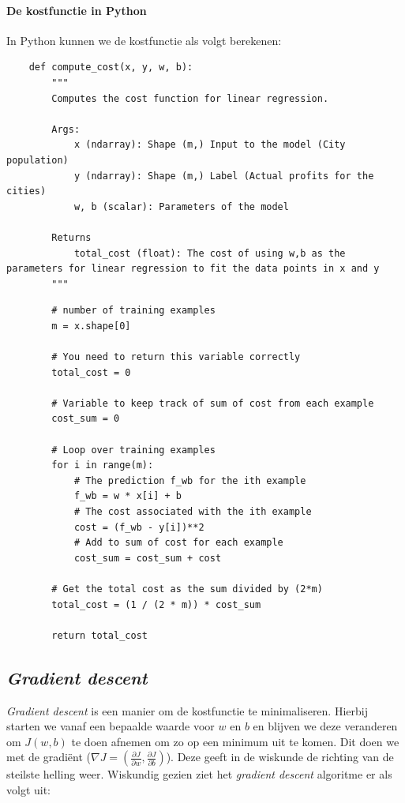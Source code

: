 \paragraph{De kostfunctie in Python}
In Python kunnen we de kostfunctie als volgt berekenen:

\begin{lstlisting}
	def compute_cost(x, y, w, b): 
	    """
	    Computes the cost function for linear regression.
	
	    Args:
	        x (ndarray): Shape (m,) Input to the model (City population) 
	        y (ndarray): Shape (m,) Label (Actual profits for the cities)
	        w, b (scalar): Parameters of the model
	        
	    Returns
	        total_cost (float): The cost of using w,b as the parameters for linear regression to fit the data points in x and y
	    """
\end{lstlisting}
\begin{lstlisting}
	    # number of training examples
	    m = x.shape[0] 
	
	    # You need to return this variable correctly
	    total_cost = 0
	
	    # Variable to keep track of sum of cost from each example
	    cost_sum = 0
	
	    # Loop over training examples
	    for i in range(m):
	        # The prediction f_wb for the ith example
	        f_wb = w * x[i] + b
	        # The cost associated with the ith example
	        cost = (f_wb - y[i])**2
	        # Add to sum of cost for each example
	        cost_sum = cost_sum + cost 
	        
	    # Get the total cost as the sum divided by (2*m)
	    total_cost = (1 / (2 * m)) * cost_sum
	
	    return total_cost
\end{lstlisting}

\subsection{\textit{Gradient descent}}

\textit{Gradient descent} is een manier om de kostfunctie te minimaliseren. Hierbij starten we vanaf een bepaalde waarde voor $w$ en $b$ en blijven we deze veranderen om $J(w, b)$ te doen afnemen om zo op een minimum uit te komen. Dit doen we met de gradiënt ($\nabla J = (\frac{\partial J}{\partial w}, \frac{\partial J}{\partial b})$). Deze geeft in de wiskunde de richting van de steilste helling weer. Wiskundig gezien ziet het \textit{gradient descent} algoritme er als volgt uit:

